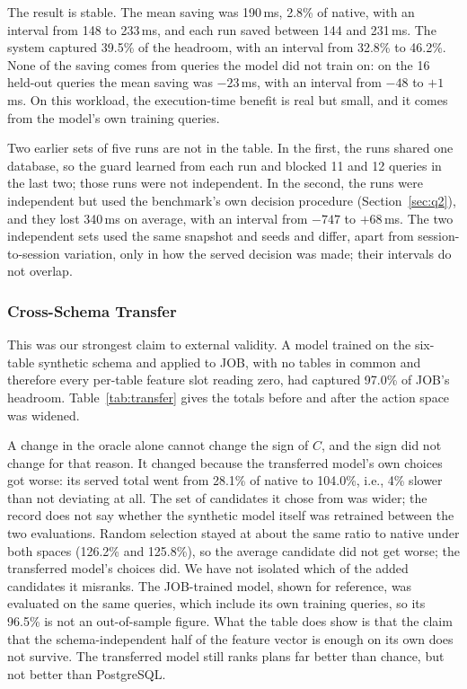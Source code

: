 \documentclass[conference]{IEEEtran}
\begin{document}
The result is stable. The mean saving was 190\,ms, 2.8\% of native, with an
interval from 148 to 233\,ms, and each run saved between 144 and 231\,ms. The
system captured 39.5\% of the headroom, with an interval from 32.8\% to
46.2\%. None of the saving comes from queries the model did not train on: on
the 16 held-out queries the mean saving was $-23$\,ms, with an interval from
$-48$ to $+1$\,ms. On this workload, the execution-time benefit is real but
small, and it comes from the model's own training queries.

Two earlier sets of five runs are not in the table. In the first, the runs
shared one database, so the guard learned from each run and blocked 11 and 12
queries in the last two; those runs were not independent. In the second, the
runs were independent but used the benchmark's own decision procedure
(Section~\ref{sec:q2}), and they lost 340\,ms on average, with an interval from
$-747$ to $+68$\,ms. The two independent sets used the same snapshot and seeds
and differ, apart from session-to-session variation, only in how the served
decision was made; their intervals do not overlap.

\subsubsection{Cross-Schema Transfer}
This was our strongest claim to external validity. A model
trained on the six-table synthetic schema and applied to JOB, with no tables in
common and therefore every per-table feature slot reading zero, had captured
97.0\% of JOB's headroom. Table~\ref{tab:transfer} gives the totals before and
after the action space was widened.

A change in the oracle alone cannot change the sign of $C$, and the sign did not
change for that reason. It changed because the transferred model's own choices
got worse: its served total went from 28.1\% of native to 104.0\%, i.e., 4\%
slower than not deviating at all. The set of candidates it chose from was
wider; the record does not say whether the synthetic model itself was retrained
between the two evaluations. Random selection stayed at about the same ratio to
native under both spaces (126.2\% and 125.8\%), so the average candidate did not
get worse; the transferred model's choices did. We have not isolated which of
the added candidates it misranks. The JOB-trained model, shown for reference,
was evaluated on the same queries, which include its own training queries, so
its 96.5\% is not an out-of-sample figure. What the table does show is that the
claim that the schema-independent half of the feature vector is enough on its
own does not survive. The transferred model still ranks plans far better than
chance, but not better than PostgreSQL.
\end{document}
